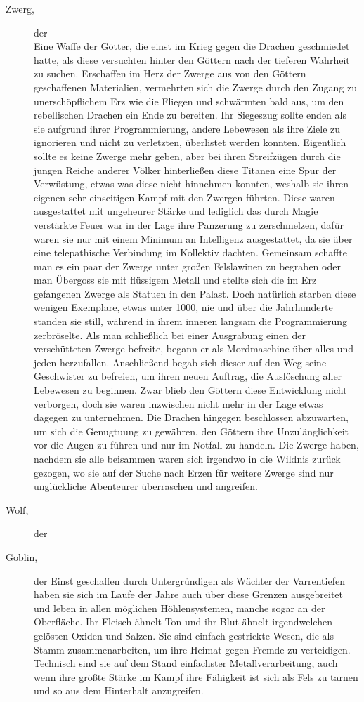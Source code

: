 \documentclass[a4paper,12pt,oneside]{book}
\begin{document}
\begin{description}
\item[Zwerg,]der
\\Eine Waffe der Götter, die einst im Krieg gegen die Drachen geschmiedet hatte, als diese versuchten hinter den Göttern nach der tieferen Wahrheit zu suchen. Erschaffen im Herz der Zwerge aus von den Göttern geschaffenen Materialien, vermehrten sich die Zwerge durch den Zugang zu unerschöpflichem Erz wie die Fliegen und schwärmten bald aus, um den rebellischen Drachen ein Ende zu bereiten. Ihr Siegeszug sollte enden als sie aufgrund ihrer Programmierung, andere Lebewesen als ihre Ziele zu ignorieren und nicht zu verletzten, überlistet werden konnten. Eigentlich sollte es keine Zwerge mehr geben, aber bei ihren Streifzügen durch die jungen Reiche anderer Völker hinterließen diese Titanen eine Spur der Verwüstung, etwas was diese nicht hinnehmen konnten, weshalb sie ihren eigenen sehr einseitigen Kampf mit den Zwergen führten. Diese waren ausgestattet mit ungeheurer Stärke und lediglich das durch Magie verstärkte Feuer war in der Lage ihre Panzerung zu zerschmelzen, dafür waren sie nur mit einem Minimum an Intelligenz ausgestattet, da sie über eine telepathische Verbindung im Kollektiv dachten. Gemeinsam schaffte man es ein paar der Zwerge unter großen Felslawinen zu begraben oder man Übergoss sie mit flüssigem Metall und stellte sich die im Erz gefangenen Zwerge als Statuen in den Palast. Doch natürlich starben diese wenigen Exemplare, etwas unter 1000, nie und über die Jahrhunderte standen sie still, während in ihrem inneren langsam die Programmierung zerbröselte. Als man schließlich bei einer Ausgrabung einen der verschütteten Zwerge befreite, begann er als Mordmaschine über alles und jeden herzufallen. Anschließend begab sich dieser auf den Weg seine Geschwister zu befreien, um ihren neuen Auftrag, die Auslöschung aller Lebewesen zu beginnen. Zwar blieb den Göttern diese Entwicklung nicht verborgen, doch sie waren inzwischen nicht mehr in der Lage etwas dagegen zu unternehmen. Die Drachen hingegen beschlossen abzuwarten, um sich die Genugtuung zu gewähren, den Göttern ihre Unzulänglichkeit vor die Augen zu führen und nur im Notfall zu handeln. Die Zwerge haben, nachdem sie alle beisammen waren sich irgendwo in die Wildnis zurück gezogen, wo sie auf der Suche nach Erzen für weitere Zwerge sind nur unglückliche Abenteurer überraschen und angreifen.

\item[Wolf,]der

\item[Goblin,]der
Einst geschaffen durch Untergründigen als Wächter der Varrentiefen haben sie sich im Laufe der Jahre auch über diese Grenzen ausgebreitet und leben in allen möglichen Höhlensystemen, manche sogar an der Oberfläche. Ihr Fleisch ähnelt Ton und ihr Blut ähnelt irgendwelchen gelösten Oxiden und Salzen. Sie sind einfach gestrickte Wesen, die als Stamm zusammenarbeiten, um ihre Heimat gegen Fremde zu verteidigen. Technisch sind sie auf dem Stand einfachster Metallverarbeitung, auch wenn ihre größte Stärke im Kampf ihre Fähigkeit ist sich als Fels zu tarnen und so aus dem Hinterhalt anzugreifen.


\end{description}
\end{document}
